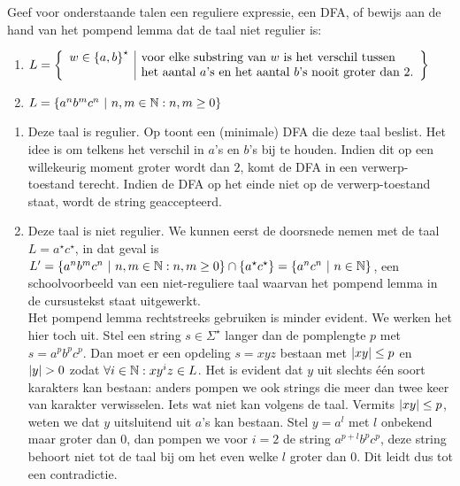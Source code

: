 \documentclass{article}
\begin{document}
\begin{question}
Geef voor onderstaande talen een reguliere expressie, een DFA, of bewijs aan de hand van het pompend lemma dat de taal niet regulier is:
\begin{enumerate}
 \item $L=\left\{ \begin{array}{l|l}w\in\left\{ a,b \right\}^{\star}&\mbox{voor elke substring van $w$ is het verschil tussen}\\&\mbox{het aantal $a$'s en het aantal $b$'s nooit groter dan 2.}\end{array} \right\}$
 \item $L=\left\{ a^nb^mc^n\ |\ n,m\in\mathbb{N}:n,m\geq 0 \right\}$
\end{enumerate}
\begin{answer}
\begin{enumerate}
 \item Deze taal is regulier. Op  toont een (minimale) DFA die deze taal beslist. Het idee is om telkens het verschil in $a$'s en $b$'s bij te houden. Indien dit op een willekeurig moment groter wordt dan $2$, komt de DFA in een verwerp-toestand terecht. Indien de DFA op het einde niet op de verwerp-toestand staat, wordt de string geaccepteerd.
 \item Deze taal is niet regulier. We kunnen eerst de doorsnede nemen met de taal $L=a^{\star}c^{\star}$, in dat geval is $L'=\left\{ a^nb^mc^n\ |\ n,m\in\mathbb{N}:n,m\geq 0 \right\}\cap\left\{ a^{\star}c^{\star} \right\}=\left\{ a^nc^n\ |\ n\in\mathbb{N} \right\}$, een schoolvoorbeeld van een niet-reguliere taal waarvan het pompend lemma in de cursustekst staat uitgewerkt.\\
 Het pompend lemma rechtstreeks gebruiken is minder evident. We werken het hier toch uit. Stel een string $s\in\Sigma^{\star}$ langer dan de pomplengte $p$ met $s=a^pb^pc^p$. Dan moet er een opdeling $s=xyz$ bestaan met $\left|xy\right|\leq p$ en $\abs{y}>0$ zodat $\forall i\in\mathbb{N}:xy^iz\in L$. Het is evident dat $y$ uit slechts \'e\'en soort karakters kan bestaan: anders pompen we ook strings die meer dan twee keer van karakter verwisselen. Iets wat niet kan volgens de taal. Vermits $\left|xy\right|\leq p$, weten we dat $y$ uitsluitend uit $a$'s kan bestaan. Stel $y=a^l$ met $l$ onbekend maar groter dan $0$, dan pompen we voor $i=2$ de string $a^{p+l}b^pc^p$, deze string behoort niet tot de taal bij om het even welke $l$ groter dan $0$. Dit leidt dus tot een contradictie.
\end{enumerate}
\end{answer}
\end{question}
\end{document}
